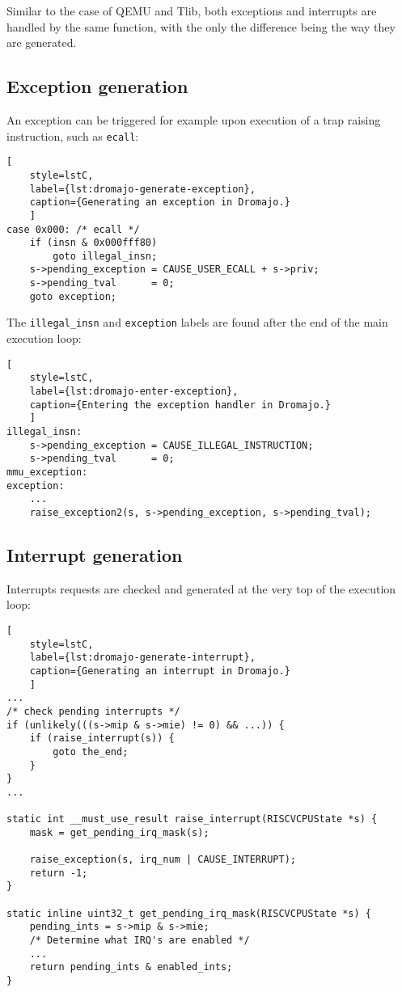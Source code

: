 Similar to the case of QEMU and Tlib, both exceptions and interrupts are handled by the same function, with the only
the difference being the way they are generated.

\subsection*{Exception generation}

An exception can be triggered for example upon execution of a trap raising instruction, such as \texttt{ecall}:

\begin{lstlisting}[
    style=lstC,
    label={lst:dromajo-generate-exception},
    caption={Generating an exception in Dromajo.}
    ]
case 0x000: /* ecall */
    if (insn & 0x000fff80)
        goto illegal_insn;
    s->pending_exception = CAUSE_USER_ECALL + s->priv;
    s->pending_tval      = 0;
    goto exception;
\end{lstlisting}

\pagebreak

\noindent
The \texttt{illegal\_insn} and \texttt{exception} labels are found after the end of the main execution loop:

\begin{lstlisting}[
    style=lstC,
    label={lst:dromajo-enter-exception},
    caption={Entering the exception handler in Dromajo.}
    ]
illegal_insn:
    s->pending_exception = CAUSE_ILLEGAL_INSTRUCTION;
    s->pending_tval      = 0;
mmu_exception:
exception:
    ...
    raise_exception2(s, s->pending_exception, s->pending_tval);
\end{lstlisting}

\subsection*{Interrupt generation}

Interrupts requests are checked and generated at the very top of the execution loop:

\begin{lstlisting}[
    style=lstC,
    label={lst:dromajo-generate-interrupt},
    caption={Generating an interrupt in Dromajo.}
    ]
...
/* check pending interrupts */
if (unlikely(((s->mip & s->mie) != 0) && ...)) {
    if (raise_interrupt(s)) {
        goto the_end;
    }
}
...

static int __must_use_result raise_interrupt(RISCVCPUState *s) {
    mask = get_pending_irq_mask(s);

    raise_exception(s, irq_num | CAUSE_INTERRUPT);
    return -1;
}

static inline uint32_t get_pending_irq_mask(RISCVCPUState *s) {
    pending_ints = s->mip & s->mie;
    /* Determine what IRQ's are enabled */
    ...
    return pending_ints & enabled_ints;
}
\end{lstlisting}

